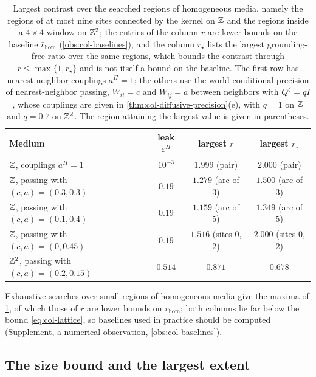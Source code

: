 \begin{table}[t]
\centering
\caption{Largest contrast over the searched regions of homogeneous media, namely the regions of at most nine sites connected by the kernel on $\mathbb{Z}$ and the regions inside a $4\times4$ window on $\mathbb{Z}^2$; the entries of the column $r$ are lower bounds on the baseline $\bar r_{\mathrm{hom}}$ (\cref{obs:col-baselines}), and the column $r_\star$ lists the largest grounding-free ratio over the same regions, which bounds the contrast through $r\le\max\{1,r_\star\}$ and is not itself a bound on the baseline. The first row has nearest-neighbor couplings $a^\Pi=1$; the others use the world-conditional precision of nearest-neighbor passing, $W_{ii}=c$ and $W_{ij}=a$ between neighbors with $Q^{\zeta}=qI$, whose couplings are given in \cref{thm:col-diffusive-precision}(e), with $q=1$ on $\mathbb{Z}$ and $q=0.7$ on $\mathbb{Z}^2$. The region attaining the largest value is given in parentheses.}
\label{tab:col-baselines}
\begin{tabular}{@{}lccc@{}}
\toprule
Medium & leak $\varepsilon^\Pi$ & largest $r$ & largest $r_\star$\\
\midrule
$\mathbb{Z}$, couplings $a^\Pi=1$ & $10^{-3}$ & $1.999$ (pair) & $2.000$ (pair)\\
$\mathbb{Z}$, passing with $(c,a)=(0.3,0.3)$ & $0.19$ & $1.279$ (arc of 3) & $1.500$ (arc of 3)\\
$\mathbb{Z}$, passing with $(c,a)=(0.1,0.4)$ & $0.19$ & $1.159$ (arc of 5) & $1.349$ (arc of 5)\\
$\mathbb{Z}$, passing with $(c,a)=(0,0.45)$ & $0.19$ & $1.516$ (sites $0$, $2$) & $2.000$ (sites $0$, $2$)\\
$\mathbb{Z}^2$, passing with $(c,a)=(0.2,0.15)$ & $0.514$ & $0.871$ & $0.678$\\
\bottomrule
\end{tabular}
\end{table}

Exhaustive searches over small regions of homogeneous media give the maxima of \cref{tab:col-baselines}, of which those of $r$ are lower bounds on $\bar r_{\mathrm{hom}}$; both columns lie far below the bound \eqref{eq:col-lattice}, so baselines used in practice should be computed (Supplement, a numerical observation, \cref{obs:col-baselines}).

\subsection{The size bound and the largest extent}\label{sec:col-size}

